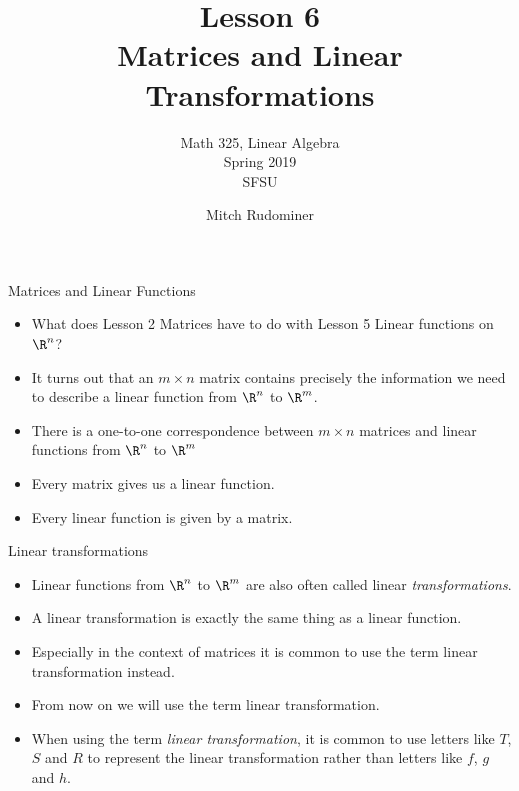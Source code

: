 \documentclass{beamer}
\title{Lesson 6 \\ Matrices and Linear Transformations}
\subtitle{Math 325, Linear Algebra \\ Spring 2019 \\ SFSU}
\author{Mitch Rudominer}
\date{}
\begin{document}
\begin{frame}
  \titlepage
\end{frame}



\begin{frame}{Matrices and Linear Functions}

\begin{itemize}
\item What does Lesson 2 Matrices have to do with Lesson 5 Linear functions on $\R^n$?
\item It turns out that an $m\times n$ matrix contains precisely the information we need
to describe a linear function from $\R^n$ to $\R^m$.
\item There is a one-to-one correspondence between $m\times n$ matrices and linear
functions from $\R^n$ to $\R^m$
\item Every matrix gives us a linear function.
\item Every linear function is given by a matrix.
\end{itemize}

\end{frame}


\begin{frame}{Linear transformations}

\begin{itemize}
\item Linear functions from $\R^n$ to $\R^m$ are also often called
linear \emph{transformations}.
\item A linear transformation is exactly the same thing as a linear function.
\item Especially in the context of matrices it is common to use the term
linear transformation instead.
\item From now on we will use the term linear transformation.
\item When using the term \emph{linear transformation}, it is common to use
letters like $T$, $S$ and $R$ to represent the linear transformation rather
than letters like $f$, $g$ and $h$.
\end{itemize}

\end{frame}

\end{document}
